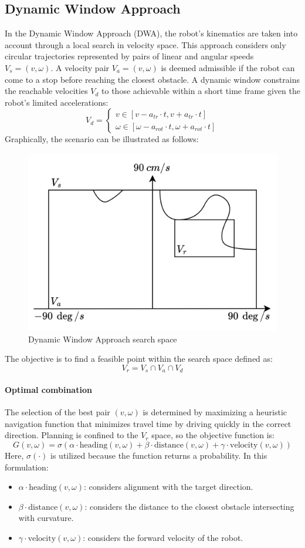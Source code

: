 \subsection{Dynamic Window Approach}
In the Dynamic Window Approach (DWA), the robot's kinematics are taken into account through a local search in velocity space.
This approach considers only circular trajectories represented by pairs of linear and angular speeds $V_s=(v,\omega)$. 
A velocity pair $V_a=(v,\omega)$ is deemed admissible if the robot can come to a stop before reaching the closest obstacle.
A dynamic window constrains the reachable velocities $V_d$ to those achievable within a short time frame given the robot's limited accelerations:
\[V_d=\begin{cases}
    v \in \left[v-a_{tr}\cdot t,v+a_{tr}\cdot t \right] \\
    \omega \in \left[\omega-a_{rot}\cdot t,\omega+a_{rot}\cdot t \right]
\end{cases}\]
Graphically, the scenario can be illustrated as follows:
\begin{figure}[H]
    \centering
    \includegraphics[width=0.6\linewidth]{images/dwa.png}
    \caption{Dynamic Window Approach search space}
\end{figure}
The objective is to find a feasible point within the search space defined as:
\[V_r =V_s \cap V_a \cap V_d\]

\paragraph*{Optimal combination}
The selection of the best pair $(v,\omega)$ is determined by maximizing a heuristic navigation function that minimizes travel time by driving quickly in the correct direction.
Planning is confined to the $V_r$ space, so the objective function is:
\[G(v,\omega)=\sigma\left(\alpha\cdot \text{heading}(v,\omega)+\beta\cdot\text{distance}(v,\omega)+\gamma\cdot \text{velocity}(v,\omega)\right)\]
Here, $\sigma(\cdot)$ is utilized because the function returns a probability. 
In this formulation:
\begin{itemize}
    \item $\alpha\cdot \text{heading}(v,\omega)$: considers alignment with the target direction.
    \item $\beta\cdot\text{distance}(v,\omega)$: considers the distance to the closest obstacle intersecting with curvature.
    \item $\gamma\cdot \text{velocity}(v,\omega)$: considers the forward velocity of the robot.
\end{itemize}

